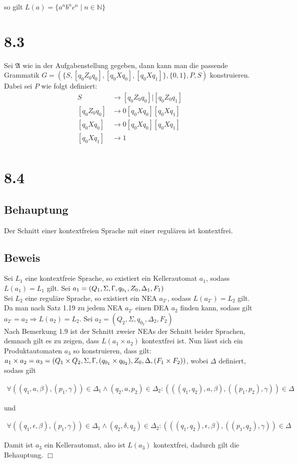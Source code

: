 \documentclass[12pt, a4paper]{article}
\begin{document}
so gilt $L(a) = \{a^n b^n c^n \mid n \in \mathbb{N} \}$
\section*{8.3}
Sei $\mathfrak{A}$ wie in der Aufgabenstellung gegeben, dann kann man die passende Grammatik $G = (\{S,[q_0Z_0q_0],[q_0Xq_0],[q_0Xq_1]\},\{0,1\},P,S)$ konstruieren. Dabei sei $P$ wie folgt definiert: 
\begin{align*}
S &\rightarrow [q_0Z_0q_0] \big| [q_0Z_0q_1]\\
[q_0Z_0q_0] &\rightarrow 0[q_0Xq_0][q_0Xq_1]\\
[q_0Xq_0] &\rightarrow 0[q_0Xq_0][q_0Xq_1]\\
[q_0Xq_1] &\rightarrow 1\\
\end{align*}

\section*{8.4}
\subsection*{Behauptung}
Der Schnitt einer kontextfreien Sprache mit einer regulären ist kontextfrei.
\subsection*{Beweis}
Sei $L_1$ eine kontextfreie Sprache, so existiert ein Kellerautomat $a_1$, sodass $L(a_1) = L_1$ gilt. Sei $a_1 = (Q_1, \Sigma, \Upgamma, q_{0_1}, Z_0, \Delta_1, F_1)$ \\
Sei $L_2$ eine reguläre Sprache, so existiert ein NEA  $a_{2'}$, sodass $L(a_{2'}) = L_2$ gilt. 
Da man nach Satz 1.19 zu jedem NEA  $a_{2'}$ einen DEA $a_2$ finden kann, sodass gilt $a_{2'} = a_2 \Rightarrow L(a_2) = L_2$. Sei $a_2 = (Q_2, \Sigma, q_{0_2}, \Delta_2, F_2)$ \\
Nach Bemerkung 1.9 ist der Schnitt zweier NEAs der Schnitt beider Sprachen, demnach gilt es zu zeigen, dass $L(a_1 \times a_2)$ kontextfrei ist. 
Nun lässt sich ein Produktautomaten $a_3$ so konstruieren, dass gilt: $a_1 \times a_2 = a_3 = (Q_1 \times Q_2, \Sigma, \Upgamma, (q_{0_1} \times q_{0_2}), Z_0, \Delta, (F_1 \times F_2))$, wobei $\Delta$ definiert, sodass gilt

\begin{align*}
\forall ((q_1, a, \beta), (p_1, \gamma)) \in \Delta_1 \wedge (q_2, a, p_2) \in \Delta_2: (((q_1, q_2), a, \beta), ((p_1, p_2), \gamma)) \in \Delta
\end{align*}

und

\begin{align*}
\forall ((q_1, \epsilon, \beta), (p_1, \gamma)) \in \Delta_1 \wedge (q_2, \delta, q_2) \in \Delta_2: (((q_1, q_2), \epsilon, \beta), ((p_1, q_2), \gamma)) \in \Delta
\end{align*}

Damit ist $a_3$ ein Kellerautomat, also ist $L(a_3)$ kontextfrei, dadurch gilt die Behauptung.
\hfill $\Box$\\
\end{document}
